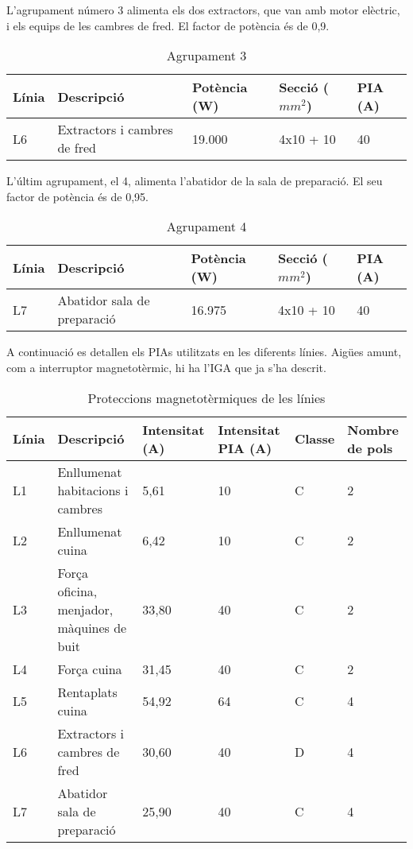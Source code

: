\noindent L'agrupament número 3 alimenta els dos extractors, que van amb motor elèctric, i els equips de les cambres de fred. El factor de potència és de 0,9.
\begin{table}[H]
\small
\begin{center}
 \begin{tabu} to \textwidth {|X[0.5, l]|X[2, l]|X[r]|X[r]|X[r]|}%
 \hline
 Línia& Descripció & Potència (W) & Secció ($mm^{2}$) & PIA (A)\\
 \hline \hline 
L6 & Extractors i cambres de fred & 19.000 & 4x10 + 10& 40 \\
 \hline
 \end{tabu}
 \caption{Agrupament 3}
\end{center}
\end{table}

\noindent L'últim agrupament, el 4, alimenta l'abatidor de la sala de preparació. El seu factor de potència és de 0,95.
\begin{table}[H]
\small
\begin{center}
 \begin{tabu} to \textwidth {|X[0.5, l]|X[2, l]|X[r]|X[r]|X[r]|}%
 \hline
 Línia& Descripció & Potència (W) & Secció ($mm^{2}$) & PIA (A)\\
 \hline \hline 
L7 & Abatidor sala de preparació & 16.975 & 4x10 + 10& 40 \\
 \hline
 \end{tabu}
 \caption{Agrupament 4}
\end{center}
\end{table}
%
%

\noindent A continuació es detallen els PIAs utilitzats en les diferents línies. Aigües amunt, com a interruptor magnetotèrmic, hi ha l'IGA que ja s'ha descrit.
\begin{table}[H]
\small
\begin{center}
 \begin{tabu} to \textwidth {|X[3, l]|X[2, l]|X[r]|X[r]|X[r]|X[r]|}%
 \hline
 Línia & Descripció & Intensitat (A) & Intensitat PIA (A) & Classe & Nombre de pols \\
 \hline \hline 
L1 & Enllumenat habitacions i cambres & 5,61 & 10 & C & 2 \\ \hline
L2 & Enllumenat cuina & 6,42 & 10 & C & 2 \\ \hline
L3 & Força oficina, menjador, màquines de buit & 33,80 & 40 & C & 2 \\ \hline
L4 & Força cuina & 31,45 & 40 & C & 2 \\ \hline
L5 & Rentaplats cuina & 54,92 & 64 & C & 4 \\ \hline
L6 & Extractors i cambres de fred & 30,60 & 40 & D & 4 \\ \hline
L7 & Abatidor sala de preparació & 25,90 & 40 & C & 4 \\ \hline

 \end{tabu}
 \caption{Proteccions magnetotèrmiques de les línies}
\end{center}
\end{table}


\clearpage
